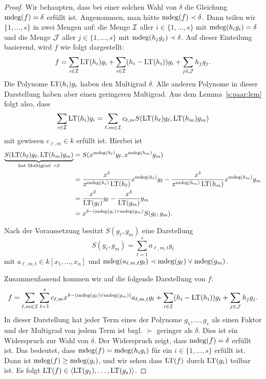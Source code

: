 \documentclass[11pt]{article}
\numberwithin{equation}{section}
\begin{document}
\begin{proof}
	Wir behaupten, dass bei einer solchen Wahl von $\delta$ die Gleichung $\operatorname{mdeg}(f) = \delta$ erfüllt ist. Angenommen, man hätte $\operatorname{mdeg}(f) \prec \delta$. Dann teilen wir $\{1,\ldots,s\}$ in zwei Mengen auf: die Menge $\mathcal{I}$ aller $i \in \{1,\ldots,s\}$ mit $\operatorname{mdeg}(h_i g_i) = \delta$ und die Menge $\mathcal{J}$ aller $j \in \{1,\ldots,s\}$ mit $\operatorname{mdeg}(h_j g_j ) \prec \delta$. Auf dieser Einteilung basierend, wird $f$ wie folgt dargestellt: 
	\[
		 f= \sum_{i \in \mathcal{I}} \operatorname{LT}(h_i) g_i  + \sum_{i \in \mathcal{I}} (h_i - \operatorname{LT}(h_i)) g_i  + \sum_{j \in \mathcal{J}} h_j g_j. 
	\]
	Die Polynome $\operatorname{LT}(h_i) g_i$ haben den Multigrad $\delta$. Alle anderen Polynome in dieser Darstellung haben aber einen geringeren Multigrad. Aus dem Lemma~\ref{s:paar:lem} folgt also, dass
	\[
		\sum_{i \in \mathcal{I}} \operatorname{LT}(h_i) g_i = \sum_{\ell,m \in \mathcal{I}} c_{\ell,m} S(\operatorname{LT}(h_\ell) g_\ell, \operatorname{LT}(h_m) g_m) 
	\]
	mit gewissen $c_{\ell,m} \in k$ erfüllt ist. Hierbei ist 
	\begin{align*}
		\underbrace{S(\operatorname{LT}(h_\ell) g_\ell, \operatorname{LT}(h_m) g_m) }_{\text{hat Multigrad} \ \prec \delta}  &  = S( x^{\operatorname{mdeg}(h_\ell)} g_\ell, x^{\operatorname{mdeg}(h_m)} g_m) 
		\\ & = \frac{x^\delta}{ x^{\operatorname{mdeg}(h_\ell)} \operatorname{LT}(h_\ell)} x^{\operatorname{mdeg}(h_\ell)} g_\ell - \frac{x^\delta}{ x^{\operatorname{mdeg}(h_m)} \operatorname{LT}(h_m)} x^{\operatorname{mdeg}(h_m)} g_m 
		\\ & = \frac{x^\delta}{\operatorname{LT}(g_\ell)} g_\ell - \frac{x^\delta}{\operatorname{LT}(g_m)} g_m 
		\\ & = x^{\delta - (\operatorname{mdeg}(g_\ell) \vee \operatorname{mdeg}(g_m)} S(g_\ell,g_m). 
	\end{align*}
	

	Nach der Voraussetzung besitzt $S(g_\ell,g_m)$ eine Darstellung 
	\[
			S(g_\ell,g_m) = \sum_{t=1}^s a_{\ell,m,t} g_t
	\]	
	mit $a_{\ell,m,t} \in k[x_1,\ldots,x_n]$ und $\operatorname{mdeg}( a_{\ell,m,t} g_t) \prec \operatorname{mdeg}(g_\ell) \vee \operatorname{mdeg}(g_m)$. 
	
	
	Zusammenfassend kommen wir auf die folgende Darstellung von $f$: 
	\begin{align*}
			f = \sum_{\ell,m \in \mathcal{I}} \sum_{t=1}^s c_{\ell,m} x^{\delta - (\operatorname{mdeg}(g_\ell) \vee \operatorname{mdeg}( g_m))} a_{\ell,m,t} g_t + \sum_{i \in \mathcal{I}} (h_i - \operatorname{LT}(h_i)) g_i + \sum_{j \in \mathcal{J}} h_j g_j. 
	\end{align*} 
	In dieser Darstellung hat jeder Term eines der Polynome $g_1,\ldots,g_s$ als einen Faktor und der Multigrad von jedem Term ist bzgl. $\succ$ geringer als $\delta$. Dies ist ein Widerspruch zur Wahl von $\delta$. Der Widerspruch zeigt, dass $\operatorname{mdeg}(f) = \delta$ erfüllt ist. Das bedeutet, dass $\operatorname{mdeg}(f) = \operatorname{mdeg}(h_i g_i)$ für ein $i \in \{1,\ldots,s\}$ erfüllt ist. Dann ist $\operatorname{mdeg}(f) \ge \operatorname{mdeg}(g_i)$, und wir sehen dass $\operatorname{LT}(f)$ durch $\operatorname{LT}(g_i)$ teilbar ist. Es folgt $\operatorname{LT}(f) \in \left<  \operatorname{LT}(g_1),\ldots, \operatorname{LT}(g_s) \right>$. 
\end{proof} 
\end{document}

